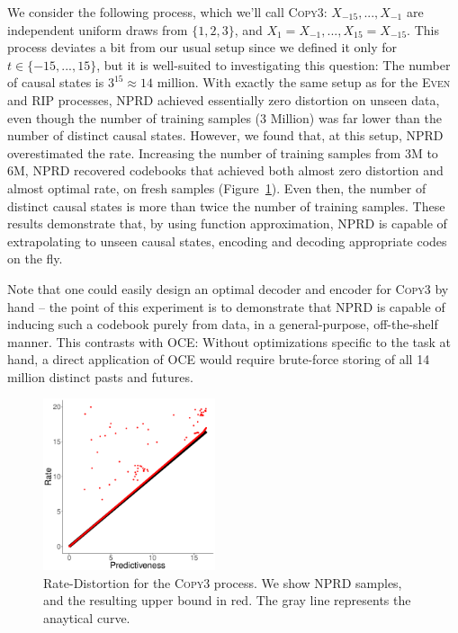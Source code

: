 \documentclass[11pt,letterpaper]{article}
\begin{document}
We consider the following process, which we'll call \textsc{Copy3}: $X_{-15}, ..., X_{-1}$ are independent uniform draws from $\{1,2,3\}$, and $X_1 = X_{-1}, ..., X_{15} = X_{-15}$.
This process deviates a bit from our usual setup since we defined it only for $t \in \{-15, ..., 15\}$, but it is well-suited to investigating this question:
The number of causal states is $3^{15} \approx 14$ million.
With exactly the same setup as for the \textsc{Even} and \textsc{RIP} processes, NPRD achieved essentially zero distortion on unseen data, even though the number of training samples (3 Million) was far lower than the number of distinct causal states.
However, we found that, at this setup, NPRD overestimated the rate.
Increasing the number of training samples from 3M to 6M, NPRD recovered codebooks that achieved both almost zero distortion and almost optimal rate, on fresh samples (Figure~\ref{fig:repeat}).
Even then, the number of distinct causal states is more than twice the number of training samples.
These results demonstrate that, by using function approximation, NPRD is capable of extrapolating to unseen causal states, encoding and decoding appropriate codes on the fly.


Note that one could easily design an optimal decoder and encoder for \textsc{Copy3} by hand -- the point of this experiment is to demonstrate that NPRD is capable of inducing such a codebook purely from data, in a general-purpose, off-the-shelf manner.
This contrasts with OCE:
Without optimizations specific to the task at hand, a direct application of OCE would require brute-force storing of all 14 million distinct pasts and futures.



\begin{figure}
\includegraphics[width=0.45\textwidth]{code/figures/repeat3-info.pdf}
	\caption{Rate-Distortion for the \textsc{Copy3} process. We show NPRD samples, and the resulting upper bound in red. The gray line represents the anaytical curve.}\label{fig:repeat}
\end{figure}
\end{document}
